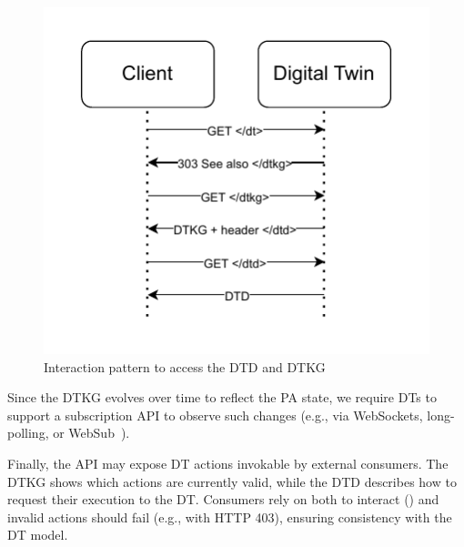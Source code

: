 \begin{figure}[t]
    \centering
     \includegraphics[width=0.7\columnwidth]{figures/hwodt/dtddtkg.pdf}
        \caption{Interaction pattern to access the \ac{DTD} and \ac{DTKG}}
        \label{fig:sequence-dtddtkg}
\end{figure}
  


Since the \ac{DTKG} evolves over time to reflect the \ac{PA} state, we require \acp{DT} to support a subscription \ac{API} to observe such changes (e.g., via WebSockets, long-polling, or WebSub~\cite{websub}).

Finally, the \ac{API} may expose \ac{DT} actions invokable by external consumers.
The \ac{DTKG} shows which actions are currently valid, while the \ac{DTD} describes how to request their execution to the \ac{DT}.
Consumers rely on both to interact () and invalid actions should fail (e.g., with HTTP 403), ensuring consistency with the \ac{DT} model.

